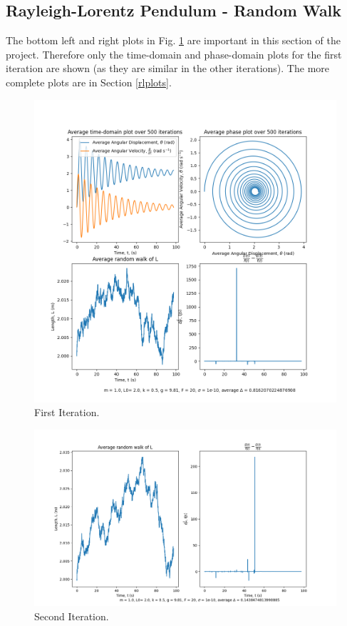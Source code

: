 \documentclass[10pt, twocolumn]{article}
\begin{document}
\subsection{Rayleigh-Lorentz Pendulum - Random Walk}{\label{rlresults}}
The bottom left and right plots in Fig. \ref{first main} are important in this section of the project. Therefore only the time-domain and phase-domain plots for the first iteration are shown (as they are similar in the other iterations). The more complete plots are in Section \ref{rlplots}.

\onecolumn
\begin{figure}[H]
    \centering
    \includegraphics[width = \columnwidth]{Projects/ForcedSimplePendulum/Plots/m = 1.0, L0= 2.0, k = 0.5, g = 9.81, F = 20, sigma = 1e-10, run number 0.png}
    \caption{First Iteration.}
    \label{first main}
\end{figure}

\begin{figure}[H]
    \centering
    \includegraphics[width = \columnwidth]{Projects/ForcedSimplePendulum/Plots/simplified m = 1.0, L0= 2.0, k = 0.5, g = 9.81, F = 20, sigma = 1e-10, run number 1.png}
    \caption{Second Iteration.}
    \label{fig:enter-label}
\end{figure}
\end{document}
